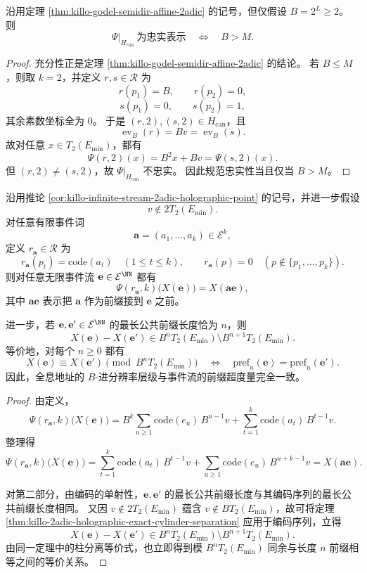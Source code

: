 \begin{theorem}[规范账本表示的最小进位阈值]\label{thm:xi-time-part9g-canonical-faithful-minimal-radix-threshold}
沿用定理 \ref{thm:killo-godel-semidir-affine-2adic} 的记号，但仅假设 \(B=2^L\ge 2\)。
则
\[
\Psi|_{H_{\mathrm{can}}}\ \text{为忠实表示}
\quad\Longleftrightarrow\quad
B>M.
\]
\end{theorem}
\begin{proof}
充分性正是定理 \ref{thm:killo-godel-semidir-affine-2adic} 的结论。
若 \(B\le M\)，则取 \(k=2\)，并定义 \(r,s\in\mathcal R\) 为
\[
r(p_1)=B,\qquad r(p_2)=0,
\]
\[
s(p_1)=0,\qquad s(p_2)=1,
\]
其余素数坐标全为 \(0\)。
于是 \((r,2),(s,2)\in H_{\mathrm{can}}\)，且
\[
\operatorname{ev}_B(r)=Bv=\operatorname{ev}_B(s).
\]
故对任意 \(x\in T_2(E_{\min})\)，都有
\[
\Psi(r,2)(x)=B^2x+Bv=\Psi(s,2)(x).
\]
但 \((r,2)\neq (s,2)\)，故 \(\Psi|_{H_{\mathrm{can}}}\) 不忠实。
因此规范忠实性当且仅当 \(B>M\)。
\end{proof}

\begin{theorem}[无限事件流地址的前缀拼接与精确超度量]\label{thm:xi-time-part9g-holographic-prefix-concatenation-ultrametric}
沿用推论 \ref{cor:killo-infinite-stream-2adic-holographic-point} 的记号，并进一步假设
\[
v\notin 2T_2(E_{\min}).
\]
对任意有限事件词
\[
\mathbf a=(a_1,\dots,a_k)\in\mathcal E^k,
\]
定义 \(r_{\mathbf a}\in\mathcal R\) 为
\[
r_{\mathbf a}(p_t)=\mathrm{code}(a_t)\quad (1\le t\le k),
\qquad
r_{\mathbf a}(p)=0\quad (p\notin\{p_1,\dots,p_k\}).
\]
则对任意无限事件流 \(\mathbf e\in\mathcal E^{\NN}\) 都有
\[
\Psi(r_{\mathbf a},k)\bigl(X(\mathbf e)\bigr)=X(\mathbf a\mathbf e),
\]
其中 \(\mathbf a\mathbf e\) 表示把 \(\mathbf a\) 作为前缀接到 \(\mathbf e\) 之前。

进一步，若 \(\mathbf e,\mathbf e'\in\mathcal E^{\NN}\) 的最长公共前缀长度恰为 \(n\)，则
\[
X(\mathbf e)-X(\mathbf e')\in B^nT_2(E_{\min})\setminus B^{n+1}T_2(E_{\min}).
\]
等价地，对每个 \(n\ge 0\) 都有
\[
X(\mathbf e)\equiv X(\mathbf e')\pmod{B^nT_2(E_{\min})}
\quad\Longleftrightarrow\quad
\mathrm{pref}_n(\mathbf e)=\mathrm{pref}_n(\mathbf e').
\]
因此，全息地址的 \(B\)-进分辨率层级与事件流的前缀超度量完全一致。
\end{theorem}
\begin{proof}
由定义，
\[
\Psi(r_{\mathbf a},k)\bigl(X(\mathbf e)\bigr)
=
B^k\sum_{u\ge 1}\mathrm{code}(e_u)\,B^{u-1}v
+\sum_{t=1}^{k}\mathrm{code}(a_t)\,B^{t-1}v.
\]
整理得
\[
\Psi(r_{\mathbf a},k)\bigl(X(\mathbf e)\bigr)
=
\sum_{t=1}^{k}\mathrm{code}(a_t)\,B^{t-1}v
+\sum_{u\ge 1}\mathrm{code}(e_u)\,B^{u+k-1}v
=
X(\mathbf a\mathbf e).
\]

对第二部分，由编码的单射性，\(\mathbf e,\mathbf e'\) 的最长公共前缀长度与其编码序列的最长公共前缀长度相同。
又因 \(v\notin 2T_2(E_{\min})\) 蕴含 \(v\notin BT_2(E_{\min})\)，故可将定理 \ref{thm:killo-2adic-holographic-exact-cylinder-separation} 应用于编码序列，立得
\[
X(\mathbf e)-X(\mathbf e')\in B^nT_2(E_{\min})\setminus B^{n+1}T_2(E_{\min}).
\]
由同一定理中的柱分离等价式，也立即得到模 \(B^nT_2(E_{\min})\) 同余与长度 \(n\) 前缀相等之间的等价关系。
\end{proof}

